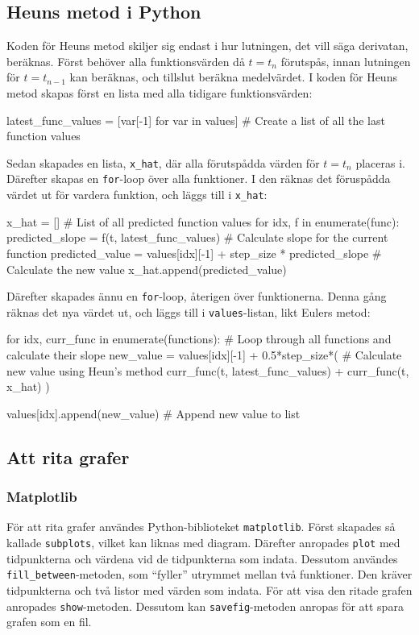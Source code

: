 \subsection{Heuns metod i Python}
Koden för Heuns metod skiljer sig endast i hur lutningen, det vill säga derivatan, beräknas. Först behöver alla funktionsvärden då \(t=t_n\) förutspås, innan lutningen för \(t=t_{n-1}\) kan beräknas, och tillslut beräkna medelvärdet. I koden för Heuns metod skapas först en lista med alla tidigare funktionsvärden:
\begin{pycode}
latest_func_values = [var[-1] for var in values] # Create a list of all the last function values
\end{pycode}
Sedan skapades en lista, \texttt{x\_hat}, där alla förutspådda värden för \(t=t_n\) placeras i. Därefter skapas en \texttt{for}-loop över alla funktioner. I den räknas det föruspådda värdet ut för vardera funktion, och läggs till i \texttt{x\_hat}:
\begin{pycode}
x_hat = [] # List of all predicted function values
for idx, f in enumerate(func):
    predicted_slope = f(t, latest_func_values) # Calculate slope for the current function
    predicted_value = values[idx][-1] + step_size * predicted_slope # Calculate the new value
    x_hat.append(predicted_value)
\end{pycode}
Därefter skapades ännu en \texttt{for}-loop, återigen över funktionerna. Denna gång räknas det nya värdet ut, och läggs till i \texttt{values}-listan, likt Eulers metod:
\begin{pycode}
for idx, curr_func in enumerate(functions): # Loop through all functions and calculate their slope
    new_value = values[idx][-1] + 0.5*step_size*( # Calculate new value using Heun's method
        curr_func(t, latest_func_values) + curr_func(t, x_hat)
    )

    values[idx].append(new_value) # Append new value to list
\end{pycode}

\subsection{Att rita grafer}
\subsubsection{Matplotlib}
För att rita grafer användes Python-biblioteket \texttt{matplotlib}. Först skapades så kallade \texttt{subplots}, vilket kan liknas med diagram. Därefter anropades \texttt{plot} med tidpunkterna och värdena vid de tidpunkterna som indata. Dessutom användes \texttt{fill\_between}-metoden, som ``fyller'' utrymmet mellan två funktioner. Den kräver tidpunkterna och två listor med värden som indata. För att visa den ritade grafen anropades \texttt{show}-metoden. Dessutom kan \texttt{savefig}-metoden anropas för att spara grafen som en fil.

